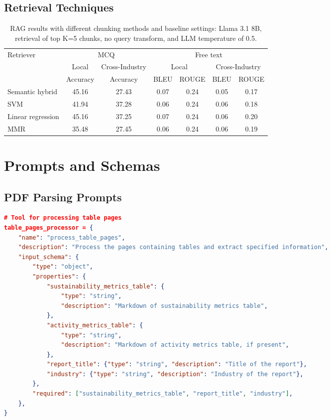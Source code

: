 \begin{appendices}
\section{Retrieval Techniques}\label{retriever_appx}
\begin{table}[H]
\centering
\begin{tabular}{lcccccc}
\hline
\multirow{3}{*}{Retriever} & \multicolumn{2}{c}{MCQ} & \multicolumn{4}{c}{Free text} \\ \cline{2-7} 
 & Local & Cross-Industry & \multicolumn{2}{c}{Local} & \multicolumn{2}{c}{Cross-Industry} \\  
 & Accuracy & Accuracy & BLEU & ROUGE & BLEU & ROUGE \\ \hline
Semantic hybrid   & 45.16 & 27.43 & 0.07 & 0.24 & 0.05 & 0.17 \\
SVM               & 41.94 & 37.28 & 0.06 & 0.24 & 0.06 & 0.18 \\
Linear regression & 45.16 & 37.25 & 0.07 & 0.24 & 0.06 & 0.20 \\
MMR               & 35.48 & 27.45 & 0.06 & 0.24 & 0.06 & 0.19 \\ \hline
\end{tabular}
\caption{RAG results with different chunking methods and baseline settings: Llama 3.1 8B, retrieval of top K=5 chunks, no query transform, and LLM temperature of 0.5.}
\label{tab:retriever-comparison-appx}
\end{table}

\chapter{Prompts and Schemas}\label{appxb}

\section{PDF Parsing Prompts}

\begin{lstlisting}[language=json,firstnumber=1,label={lst:pdf_parse_prompt},caption={Schemas and prompts for PDF table and text extraction}]
# Tool for processing table pages
table_pages_processor = {
    "name": "process_table_pages",
    "description": "Process the pages containing tables and extract specified information",
    "input_schema": {
        "type": "object",
        "properties": {
            "sustainability_metrics_table": {
                "type": "string",
                "description": "Markdown of sustainability metrics table",
            },
            "activity_metrics_table": {
                "type": "string",
                "description": "Markdown of activity metrics table, if present",
            },
            "report_title": {"type": "string", "description": "Title of the report"},
            "industry": {"type": "string", "description": "Industry of the report"},
        },
        "required": ["sustainability_metrics_table", "report_title", "industry"],
    },
}


\end{lstlisting}
\end{appendices}
